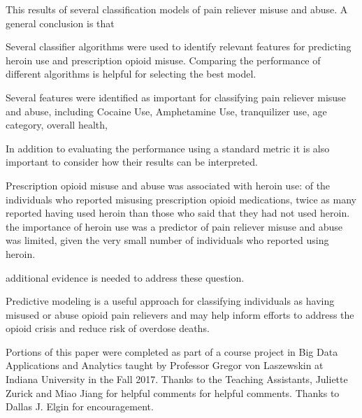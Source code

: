 \documentclass[sigconf]{acmart}
\begin{document}
This results of several classification models of 
pain reliever misuse and abuse. A general conclusion is that 

Several classifier algorithms were used to identify relevant features for 
predicting heroin use and prescription opioid misuse. Comparing the performance 
of different algorithms is helpful for  selecting the best model. 

Several features were identified as important for classifying pain reliever
misuse and abuse, including Cocaine Use, Amphetamine Use, tranquilizer use,
age category, overall health,

In addition to evaluating the performance using
a standard metric it is also important to consider how their results 
can be interpreted.

Prescription opioid misuse and abuse was associated with heroin use: of 
the individuals who reported misusing prescription opioid medications, twice 
as many reported having used heroin than those who said that they had not used 
heroin. the importance of heroin use was a predictor of pain reliever misuse and
abuse was limited, given the very small number of individuals who reported 
using heroin.

additional evidence is needed to address these question. 

Predictive modeling is a useful approach for classifying individuals as 
having misused or abuse opioid pain relievers and may help inform 
efforts to address the opioid crisis and reduce risk of overdose deaths. 


\begin{acks}

Portions of this paper were completed as part of a course project in Big Data 
Applications and Analytics taught by Professor Gregor von Laszewskin at 
Indiana University in the Fall 2017. Thanks to the Teaching Assistants, 
Juliette Zurick and Miao Jiang for helpful comments for helpful comments. 
Thanks to Dallas J. Elgin for encouragement. 

\end{acks}

 

%
\end{document}
